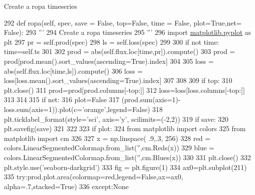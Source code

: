 \begin{DoxyVerb}Create a ropa timeseries
\end{DoxyVerb}
 
\begin{DoxyCode}
292     \textcolor{keyword}{def }ropa(self, spec, save = False, top=False, time = False, plot=True,net= False):
293         \textcolor{stringliteral}{'''}
294 \textcolor{stringliteral}{        Create a ropa timeseries}
295 \textcolor{stringliteral}{        '''}
296         \textcolor{keyword}{import} \mbox{\hyperlink{namespacematplotlib_1_1pyplot}{matplotlib.pyplot}} \textcolor{keyword}{as} plt
297         pr = self.prod(spec)
298         ls = self.loss(spec)
299 
300         \textcolor{keywordflow}{if} \textcolor{keywordflow}{not} time: time=self.ts
301 
302         prod = abs(self.flux.loc[time,pr]).compute()
303         prod = prod[prod.mean().sort\_values(ascending=\textcolor{keyword}{True}).index]
304 
305         loss = abs(self.flux.loc[time,ls]).compute()
306         loss = loss[loss.mean().sort\_values(ascending=\textcolor{keyword}{True}).index]
307 
308 
309         \textcolor{keywordflow}{if} top:
310             plt.close()
311             prod=prod[prod.columns[-top:]]
312             loss=loss[loss.columns[-top:]]
313 
314 
315         \textcolor{keywordflow}{if} net:
316             plot=\textcolor{keyword}{False}
317             (prod.sum(axis=1)-loss.sum(axis=1)).plot(c=\textcolor{stringliteral}{'orange'},legend=\textcolor{keyword}{False})
318             plt.ticklabel\_format(style=\textcolor{stringliteral}{'sci'}, axis=\textcolor{stringliteral}{'y'}, scilimits=(-2,2))
319             \textcolor{keywordflow}{if} save:
320                 plt.savefig(save)
321 
322 
323         \textcolor{keywordflow}{if} plot:
324             \textcolor{keyword}{from} matplotlib \textcolor{keyword}{import} colors
325             \textcolor{keyword}{from} matplotlib \textcolor{keyword}{import} cm
326 
327             x = np.linspace( .9,.3, 256)
328             red = colors.LinearSegmentedColormap.from\_list(\textcolor{stringliteral}{''},cm.Reds(x))
329             blue = colors.LinearSegmentedColormap.from\_list(\textcolor{stringliteral}{''},cm.Blues(x))
330 
331             plt.close()
332             plt.style.use(\textcolor{stringliteral}{'seaborn-darkgrid'})
333             fig = plt.figure(1)
334             ax0=plt.subplot(211)
335             \textcolor{keywordflow}{try}:prod.plot.area(colormap=red,legend=\textcolor{keyword}{False},ax=ax0, alpha=.7,stacked=\textcolor{keyword}{True})
336             \textcolor{keywordflow}{except}:\textcolor{keywordtype}{None}

\end{DoxyCode}
